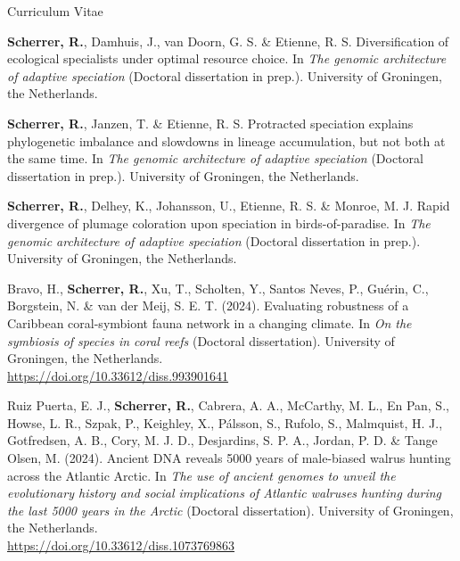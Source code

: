 \documentclass[11pt,a4paper]{article}
\begin{document}
\begin{cv}{Curriculum Vitae}
\begin{cvlist}{}
            \item[]
            \textbf{Scherrer, R.}, Damhuis, J., van Doorn, G. S. \& Etienne, R. S. Diversification of ecological specialists under optimal resource choice. In \textit{The genomic architecture of adaptive speciation} (Doctoral dissertation in prep.). University of Groningen, the Netherlands.

            \item[]
            \textbf{Scherrer, R.}, Janzen, T. \& Etienne, R. S. Protracted speciation explains phylogenetic imbalance and slowdowns in lineage accumulation, but not both at the same time. In \textit{The genomic architecture of adaptive speciation} (Doctoral dissertation in prep.). University of Groningen, the Netherlands.

            \item[]
            \textbf{Scherrer, R.}, Delhey, K., Johansson, U., Etienne, R. S. \& Monroe, M. J. Rapid divergence of plumage coloration upon speciation in birds-of-paradise. In \textit{The genomic architecture of adaptive speciation} (Doctoral dissertation in prep.). University of Groningen, the Netherlands.

            \item[]
            Bravo, H., \textbf{Scherrer, R.}, Xu, T., Scholten, Y., Santos Neves, P., Gu\'{e}rin, C., Borgstein, N. \& van der Meij, S. E. T. (2024). Evaluating robustness of a Caribbean coral-symbiont fauna network in a changing climate. In \textit{On the symbiosis of species in coral reefs} (Doctoral dissertation). University of Groningen, the Netherlands.\\
            \url{https://doi.org/10.33612/diss.993901641}

            \item[]
            Ruiz Puerta, E. J., \textbf{Scherrer, R.}, Cabrera, A. A., McCarthy, M. L., En Pan, S., Howse, L. R., Szpak, P., Keighley, X., Pálsson, S., Rufolo, S., Malmquist, H. J., Gotfredsen, A. B., Cory, M. J. D., Desjardins, S. P. A., Jordan, P. D. \& Tange Olsen, M. (2024). Ancient DNA reveals 5000 years of male-biased walrus hunting across the Atlantic Arctic. In 
            \textit{The use of ancient genomes to unveil the evolutionary history and social implications of Atlantic walruses hunting during the last 5000 years in the Arctic} (Doctoral dissertation). University of Groningen, the Netherlands.\\
            \url{https://doi.org/10.33612/diss.1073769863}
            

\end{cvlist}
\end{cv}
\end{document}
